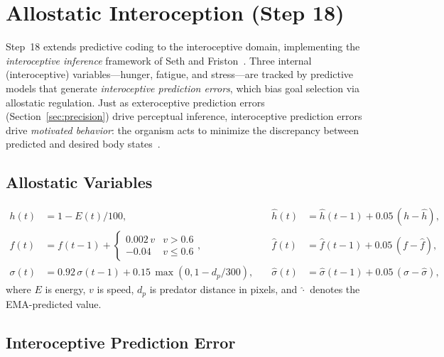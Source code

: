 \documentclass[11pt,a4paper]{article}
\begin{document}
\section{Allostatic Interoception (Step 18)}\label{sec:allostasis}

Step~18 extends predictive coding to the interoceptive domain, implementing
the \emph{interoceptive inference} framework of Seth and
Friston~\cite{seth2016,barrett2015}.
Three internal (interoceptive) variables---hunger, fatigue, and
stress---are tracked by predictive models that generate
\emph{interoceptive prediction errors}, which bias goal selection via
allostatic regulation.
Just as exteroceptive prediction errors (Section~\ref{sec:precision})
drive perceptual inference, interoceptive prediction errors drive
\emph{motivated behavior}: the organism acts to minimize the discrepancy
between predicted and desired body states~\cite{pezzulo2015,craig2002}.

\subsection{Allostatic Variables}

\begin{equation}\label{eq:allostasis}
\boxed{
\begin{aligned}
  h(t) &= 1 - E(t)/100,  &\quad
  \hat{h}(t) &= \hat{h}(t{-}1) + 0.05\,(h - \hat{h}), \\
  f(t) &= f(t{-}1) + \begin{cases}
    0.002\,v & v > 0.6 \\
    -0.04    & v \leq 0.6
  \end{cases}, &\quad
  \hat{f}(t) &= \hat{f}(t{-}1) + 0.05\,(f - \hat{f}), \\
  \sigma(t) &= 0.92\,\sigma(t{-}1)
    + 0.15\,\max(0, 1{-}d_p/300), &\quad
  \hat{\sigma}(t) &= \hat{\sigma}(t{-}1) + 0.05\,(\sigma - \hat{\sigma}),
\end{aligned}
}
\end{equation}
where $E$ is energy, $v$ is speed, $d_p$ is predator distance in pixels,
and $\hat{\cdot}$ denotes the EMA-predicted value.

\subsection{Interoceptive Prediction Error}
\end{document}
